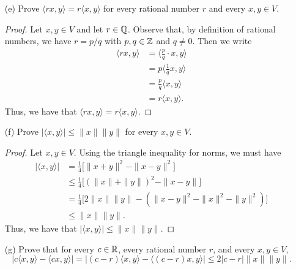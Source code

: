 \begin{enumerate}
\begin{proof}
        \[  m \Big\langle  \frac{ 1 }{ m }  x  , y \Big\rangle = \langle x , y \rangle. \]
        \end{proof}
    \item[(e)] Prove \( \langle rx , y \rangle = r \langle x , y \rangle \) for every rational number \( r  \) and every \( x,y \in V  \).
        \begin{proof}
        Let \( x,y \in V  \) and let \( r \in \mathbb{Q}  \). Observe that, by definition of rational numbers, we have \( r =  p/q  \) with \( p,q \in \mathbb{Z}  \) and \( q \neq 0  \). Then we write
        \begin{align*}
            \langle rx , y \rangle &= \Big\langle \frac{ p }{ q } \cdot  x   , y \Big\rangle \\
                                   &= p \Big\langle \frac{ 1 }{ q }  x   , y  \Big\rangle \tag{Part (c)} \\
                                   &= \frac{ p }{ q }  \langle x , y \rangle \tag{Part (d)} \\
                                   &= r \langle x , y \rangle.
        \end{align*}
        Thus, we have that \( \langle rx , y \rangle = r \langle x , y \rangle \).
        \end{proof}
    \item[(f)] Prove \( |  \langle x , y \rangle |  \leq \|x\|\|y\| \) for every \( x,y \in V  \).  
        \begin{proof}
        Let \( x,y \in V  \). Using the triangle inequality for norms, we must have
        \begin{align*}
            | \langle x , y \rangle | &= \frac{ 1 }{ 4 }  \Big[ \|x + y\|^{2} - \|x - y\|^{2} \Big] \\
                                      &\leq \frac{ 1 }{ 4 }  \Big[ (\|x\| + \|y\|)^{2} - \|x - y\|\Big] \\
                                      &= \frac{ 1 }{ 4 }  \Big[ 2 \|x \| \|y\| - (\|x -y\|^{2} - \|x\|^{2} - \|y\|^{2})\Big] \\
                                      &\leq \|x\| \|y\|.  
        \end{align*}
        Thus, we have that \( | \langle x , y \rangle  |  \leq \|x \| \|y\|  \).
        \end{proof}
    \item[(g)] Prove that for every \( c \in \mathbb{R}  \), every rational number \( r  \), and every \( x,y \in V  \),
        \[ | c \langle x , y \rangle - \langle cx , y \rangle | = | (c-r)\langle x , y \rangle - \langle (c-r)x ,y  \rangle | \leq 2 | c - r  |  \|x\| \|y\|.   \]

\end{enumerate}
